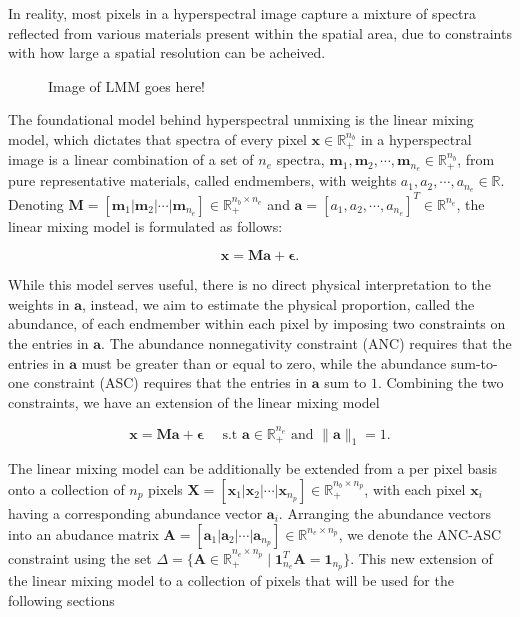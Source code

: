In reality, most pixels in a hyperspectral image capture a mixture of spectra reflected from various materials present within the spatial area, due to constraints with how large a spatial resolution can be acheived. 

\begin{figure}[h]
    \caption{Image of LMM goes here!}
    \label{fig:figure2}
\end{figure}


The foundational model behind hyperspectral unmixing is the linear mixing model, which dictates that spectra of every pixel $\mathbf{x} \in \mathbb{R}_+^{n_b}$ in a hyperspectral image is a linear combination of a set of $n_e$ spectra, $\mathbf{m} _1, \mathbf{m} _2, \cdots, \mathbf{m} _{n_e} \in \mathbb{R}_+^{n_b}$, from pure representative materials, called endmembers, with weights $a_1, a_2, \cdots, a_{n_e} \in \mathbb{R}$. Denoting $\mathbf{M} = [\mathbf{m} _1 | \mathbf{m} _2 | \cdots |\mathbf{m} _{n_e}] \in \mathbb{R}_+^{n_b \times n_e}$ and $\mathbf{a} = [a_1, a_2, \cdots ,a_{n_e}]^T \in \mathbb{R}^{n_e}$, the linear mixing model is formulated as follows:

\begin{equation}
    \label{lmm:model}
    \mathbf{x} = \mathbf{M} \mathbf{a} + \mathbf{\epsilon}.
\end{equation}

While this model serves useful, there is no direct physical interpretation to the weights in $\mathbf{a}$, instead, we aim to estimate the physical proportion, called the abundance, of each endmember within each pixel by imposing two constraints on the entries in $\mathbf{a}$. The abundance nonnegativity constraint (ANC) requires that the entries in $\mathbf{a}$ must be greater than or equal to zero, while the abundance sum-to-one constraint (ASC) requires that the entries in $\mathbf{a}$ sum to $1$. Combining the two constraints, we have an extension of the linear mixing model

\begin{equation}
    \label{lmm:abund-lmm}
    \mathbf{x} = \mathbf{M} \mathbf{a} + \mathbf{\epsilon} \quad \text{ s.t } \mathbf{a} \in \mathbb{R}_+^{n_e} \text{ and } \|\mathbf{a}\|_1 = 1.
\end{equation}

The linear mixing model can be additionally be extended from a per pixel basis onto a collection of $n_p$ pixels $\mathbf{X} = [\mathbf{x}_1 | \mathbf{x}_2 | \cdots | \mathbf{x}_{n_p}] \in \mathbb{R}_ +^{n_b \times n_p}$, with each pixel $\mathbf{x}_i$ having a corresponding abundance vector $\mathbf{a}_i$. Arranging the abundance vectors into an abudance matrix $\mathbf{A} = [\mathbf{a}_1 | \mathbf{a}_2 | \cdots | \mathbf{a}_{n_p}] \in \mathbb{R}^{n_e \times n_p}$, we denote the ANC-ASC constraint using the set $ \Delta = \{ \mathbf{A} \in \mathbb{R}_+^{n_e \times n_p} \mid \mathbf{1}_{n_e}^T \mathbf{A} = \mathbf{1}_{n_p}\} $. This new extension of the linear mixing model to a collection of pixels that will be used for the following sections

